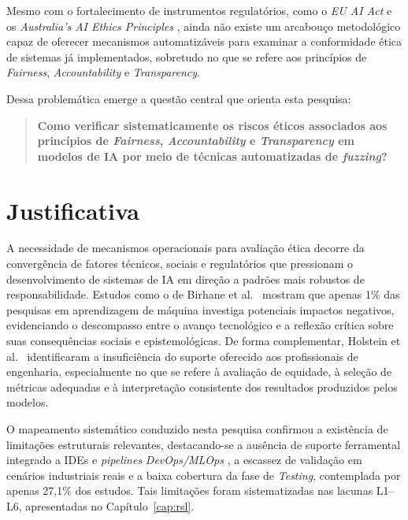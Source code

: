 Mesmo com o fortalecimento de instrumentos regulatórios, como o \textit{EU AI Act} \cite{EUAIAct2024} e os \textit{Australia's AI Ethics Principles} \cite{AustraliaAI2019}, ainda não existe um arcabouço metodológico capaz de oferecer mecanismos automatizáveis para examinar a conformidade ética de sistemas já implementados, sobretudo no que se refere aos princípios de \textit{Fairness}, \textit{Accountability} e \textit{Transparency}.

Dessa problemática emerge a questão central que orienta esta pesquisa:

\begin{quote}
\textbf{Como verificar sistematicamente os riscos éticos associados aos princípios de \textit{Fairness}, \textit{Accountability} e \textit{Transparency} em modelos de IA por meio de técnicas automatizadas de \textit{fuzzing}?}
\end{quote}

\section{Justificativa}

A necessidade de mecanismos operacionais para avaliação ética decorre da convergência de fatores técnicos, sociais e regulatórios que pressionam o desenvolvimento de sistemas de IA em direção a padrões mais robustos de responsabilidade. Estudos como o de Birhane et al.~\cite{Birhane2022} mostram que apenas 1\% das pesquisas em aprendizagem de máquina investiga potenciais impactos negativos, evidenciando o descompasso entre o avanço tecnológico e a reflexão crítica sobre suas consequências sociais e epistemológicas. De forma complementar, Holstein et al.~\cite{Holstein2019} identificaram a insuficiência do suporte oferecido aos profissionais de engenharia, especialmente no que se refere à avaliação de equidade, à seleção de métricas adequadas e à interpretação consistente dos resultados produzidos pelos modelos.

O mapeamento sistemático conduzido nesta pesquisa confirmou a existência de limitações estruturais relevantes, destacando-se a ausência de suporte ferramental integrado a IDEs e \textit{pipelines} \textit{DevOps/MLOps} \cite{S010, S021, S030}, a escassez de validação em cenários industriais reais \cite{Holstein2019} e a baixa cobertura da fase de \textit{Testing}, contemplada por apenas 27,1\% dos estudos. Tais limitações foram sistematizadas nas lacunas L1--L6, apresentadas no Capítulo~\ref{cap:rsl}.

